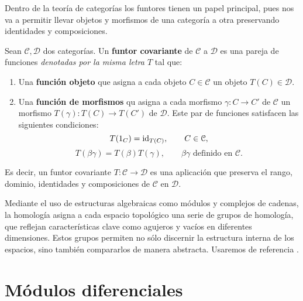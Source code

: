 Dentro de la teoría de categorías los funtores tienen un papel principal, pues
nos va a permitir llevar objetos y morfismos de una categoría a otra preservando
identidades y composiciones.

\begin{definicion}
	Sean \(\mathcal{C}, \mathcal{D}\) dos categorías. Un \textbf{funtor covariante} de
	\(\mathcal{C}\) a \(\mathcal{D}\) es una pareja de funciones \textit{denotadas por
	la misma letra \(T\)} tal que:
	\begin{enumerate}
		\item Una \textbf{función objeto} que asigna a cada objeto
			\(C \in \mathcal{C}\) un objeto \(T(C) \in \mathcal{D}\).
		\item Una \textbf{función de morfismos} qu asigna a cada morfismo
			\(\gamma: C \rightarrow C'\) de \(\mathcal{C}\) un morfismo
			\(T(\gamma): T(C) \rightarrow T(C')\) de \(\mathcal{D}\). Este par de funciones
			satisfacen las siguientes condiciones:
			\begin{equation}
				T(1_{C}) = \operatorname{id}_{T(C)}, \qquad C \in \mathcal{C},
			\end{equation}
			\begin{equation}
				T(\beta \gamma) = T(\beta)T(\gamma), \qquad \beta \gamma \text{ definido
				en }\mathcal{C}.
			\end{equation}
	\end{enumerate}
\end{definicion}

Es decir, un funtor covariante \(T: \mathcal{C}\rightarrow \mathcal{D}\) es una
aplicación que preserva el rango, dominio, identidades y composiciones de
\(\mathcal{C}\) en \(\mathcal{D}\).


Mediante el uso de estructuras algebraicas como módulos y complejos de cadenas,
la homología asigna a cada espacio topológico una serie de grupos de homología, que
reflejan características clave como agujeros y vacíos en diferentes dimensiones.
Estos grupos permiten no sólo discernir la estructura interna de los espacios, sino
también compararlos de manera abstracta. Usaremos de referencia
\cite{maclane2012homology}.

\section{Módulos diferenciales}

